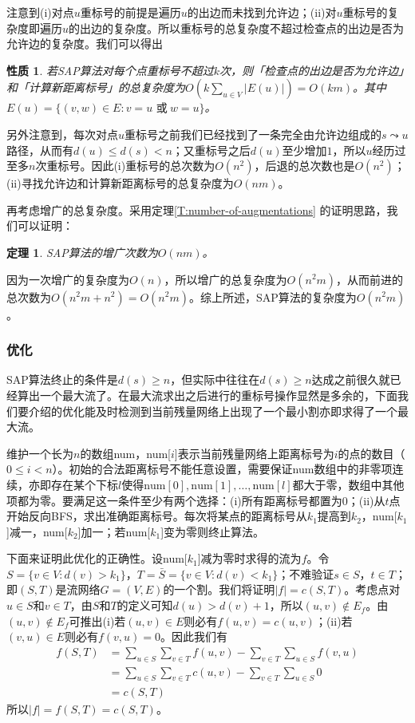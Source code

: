 \documentclass{ctexbook}
\newtheorem{theorem}{定理}[chapter] %
\newtheorem{property}{性质}[chapter]
\begin{document}
  注意到(i)对点$u$重标号的前提是遍历$u$的出边而未找到允许边；(ii)对$u$重标号的复杂度即遍历$u$的出边的复杂度。所以重标号的总复杂度不超过检查点的出边是否为允许边的复杂度。我们可以得出
  \begin{property}
    若SAP算法对每个点重标号不超过$k$次，则「检查点的出边是否为允许边」和「计算新距离标号」的总复杂度为$O(k\sum\limits_{u\in V}|E(u)|)=O(km)$。其中$E(u)=\{(v,w)\in E\colon v= u \text{ 或}\ w = u\}$。
  \end{property}
  另外注意到，每次对点$u$重标号之前我们已经找到了一条完全由允许边组成的$s\leadsto u$路径，从而有$d(u)\le d(s)< n$；又重标号之后$d(u)$至少增加$1$，所以$u$经历过至多$n$次重标号。因此(i)重标号的总次数为$O(n^2)$，后退的总次数也是$O(n^2)$；(ii)寻找允许边和计算新距离标号的总复杂度为$O(nm)$。

  再考虑增广的总复杂度。采用定理\ref{T:number-of-augmentations} 的证明思路，我们可以证明：
  \begin{theorem}
    SAP算法的增广次数为$O(nm)$。
  \end{theorem}
  因为一次增广的复杂度为$O(n)$，所以增广的总复杂度为$O(n^2m)$，从而前进的总次数为$O(n^2m+n^2)=O(n^2m)$。综上所述，SAP算法的复杂度为$O(n^2m)$。
  \subsubsection{优化}
  SAP算法终止的条件是$d(s)\ge n$，但实际中往往在$d(s)\ge n$达成之前很久就已经算出一个最大流了。在最大流求出之后进行的重标号操作显然是多余的，下面我们要介绍的优化能及时检测到当前残量网络上出现了一个最小割亦即求得了一个最大流。

  维护一个长为$n$的数组num，num[$i$]表示当前残量网络上距离标号为$i$的点的数目（$0\le i < n$）。初始的合法距离标号不能任意设置，需要保证num数组中的非零项连续，亦即存在某个下标$l$使得$\mathrm{num}[0],\mathrm{num}[1],\dots,\mathrm{num}[l]$都大于零，数组中其他项都为零。要满足这一条件至少有两个选择：(i)所有距离标号都置为$0$；(ii)从$t$点开始反向BFS，求出准确距离标号。每次将某点的距离标号从$k_1$提高到$k_2$，num[$k_1$]减一，num[$k_2$]加一；若num[$k_1$]变为零则终止算法。

  下面来证明此优化的正确性。设num[$k_1$]减为零时求得的流为$f$。令$S=\{v\in V\colon d(v)>k_1\}$，$T=\bar{S}=\{v\in V\colon d(v)<k_1\}$；不难验证$s\in S$，$t\in T$；即$(S,T)$是流网络$G=(V,E)$的一个割。我们将证明$|f|=c(S,T)$。考虑点对$u\in S$和$v\in T$，由$S$和$T$的定义可知$d(u)>d(v)+1$，所以$(u,v)\notin E_f$。由$(u,v)\notin E_f$可推出(i)若$(u,v)\in E$则必有$f(u,v) = c(u,v)$；(ii)若$(v,u)\in E$则必有$f(v,u)=0$。因此我们有
  \begin{align*}
    f(S,T) &= \sum_{u\in S}\sum_{v\in T}f(u,v)-\sum_{v\in T}\sum_{u\in S}f(v,u)\\
    &= \sum_{u\in S}\sum_{v\in T}c(u,v)-\sum_{v\in T}\sum_{u\in S}0\\
    &= c(S,T)
  \end{align*}
  所以$|f|=f(S,T)=c(S,T)$。
\end{document}
